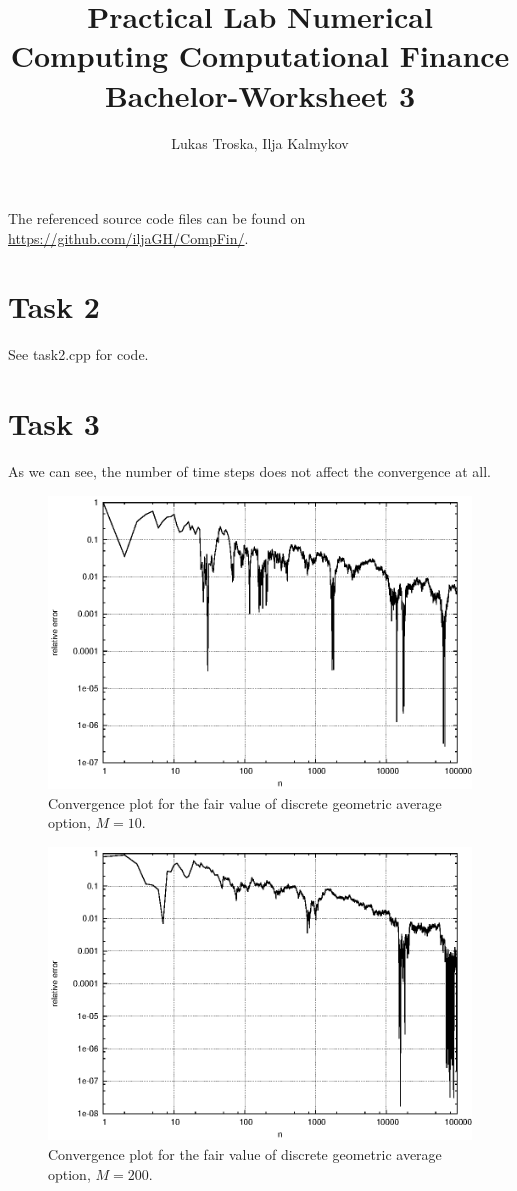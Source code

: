 \documentclass[]{article}
\title{Practical Lab Numerical Computing Computational Finance \\Bachelor-Worksheet 3}
\author{Lukas Troska, Ilja Kalmykov}
\date{}
\begin{document}
\maketitle

The referenced source code files can be found on
\url{https://github.com/iljaGH/CompFin/}.

\section*{Task 2}
See task2.cpp for code.

\section*{Task 3}
As we can see, the number of time steps does not
affect the convergence at all.
\begin{figure}[!ht]
\centering
\includegraphics[width=.9\textwidth]{task3_10.eps}
\caption{Convergence plot for the fair value of discrete geometric average
option, $M = 10$.}
\label{fig:Task3a}
\end{figure}
\begin{figure}[!ht]
\centering
\includegraphics[width=.9\textwidth]{task3_200.eps}
\caption{Convergence plot for the fair value of discrete geometric average
option, $M = 200$.}
\label{fig:Task3b}
\end{figure}
\clearpage
\end{document}
